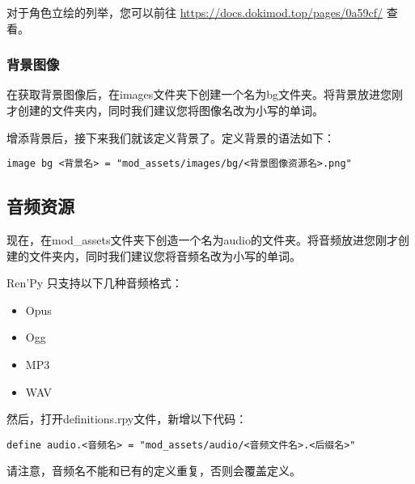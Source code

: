 对于角色立绘的列举，您可以前往 \url{https://docs.dokimod.top/pages/0a59cf/} 查看。

\subsubsection{背景图像}
在获取背景图像后，在images文件夹下创建一个名为bg文件夹。将背景放进您刚才创建的文件夹内，同时我们建议您将图像名改为小写的单词。

增添背景后，接下来我们就该定义背景了。定义背景的语法如下：

\begin{lstlisting}
image bg <背景名> = "mod_assets/images/bg/<背景图像资源名>.png"
\end{lstlisting}


\subsection{音频资源}
现在，在mod\_assets文件夹下创造一个名为audio的文件夹。将音频放进您刚才创建的文件夹内，同时我们建议您将音频名改为小写的单词。

\begin{Warning}
    Ren'Py 只支持以下几种音频格式：
    \begin{itemize}
        \item Opus
        \item Ogg
        \item MP3
        \item WAV
    \end{itemize}
\end{Warning}

然后，打开definitions.rpy文件，新增以下代码：
\begin{lstlisting}
define audio.<音频名> = "mod_assets/audio/<音频文件名>.<后缀名>"
\end{lstlisting}

请注意，音频名不能和已有的定义重复，否则会覆盖定义。
